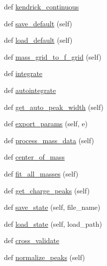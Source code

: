 \begin{DoxyCompactItemize}
\item 
def \hyperlink{class_uni_dec_1_1unidec_1_1_uni_dec_ac344ecb79f8a01cb8ecdd7459771c6be}{kendrick\+\_\+continuous}
\item 
def \hyperlink{class_uni_dec_1_1unidec_1_1_uni_dec_a78259a4b2c592f32a8b039e277f67e3c}{save\+\_\+default} (self)
\item 
def \hyperlink{class_uni_dec_1_1unidec_1_1_uni_dec_a4f1fe4dbaf59cdce231b50922ac94811}{load\+\_\+default} (self)
\item 
def \hyperlink{class_uni_dec_1_1unidec_1_1_uni_dec_ae3287b4ef1a2ede9f3c38fb027ffffea}{mass\+\_\+grid\+\_\+to\+\_\+f\+\_\+grid} (self)
\item 
def \hyperlink{class_uni_dec_1_1unidec_1_1_uni_dec_aa7e154f30f71d03e37969c012365b825}{integrate}
\item 
def \hyperlink{class_uni_dec_1_1unidec_1_1_uni_dec_afb6b4140d46c4a50f72089c4547acc33}{autointegrate}
\item 
def \hyperlink{class_uni_dec_1_1unidec_1_1_uni_dec_a5c15c7af6300484007805b71b9ef6e6a}{get\+\_\+auto\+\_\+peak\+\_\+width} (self)
\item 
def \hyperlink{class_uni_dec_1_1unidec_1_1_uni_dec_abc3b760ae3be4bad42acd17b24bf07fe}{export\+\_\+params} (self, e)
\item 
def \hyperlink{class_uni_dec_1_1unidec_1_1_uni_dec_a1c769a0b89a9fd023c92c560b72ff68c}{process\+\_\+mass\+\_\+data} (self)
\item 
def \hyperlink{class_uni_dec_1_1unidec_1_1_uni_dec_a95dcf60d7a9fcd406fccaddab86fb5d3}{center\+\_\+of\+\_\+mass}
\item 
def \hyperlink{class_uni_dec_1_1unidec_1_1_uni_dec_ad737c43319a27076ece8e994597ded79}{fit\+\_\+all\+\_\+masses} (self)
\item 
def \hyperlink{class_uni_dec_1_1unidec_1_1_uni_dec_a01ea6512d8b5ea226db571ea6d974b60}{get\+\_\+charge\+\_\+peaks} (self)
\item 
def \hyperlink{class_uni_dec_1_1unidec_1_1_uni_dec_aadab1a0cbb4870da3c060ff5ee334fa5}{save\+\_\+state} (self, file\+\_\+name)
\item 
def \hyperlink{class_uni_dec_1_1unidec_1_1_uni_dec_acdab5edac8a83708f248d1edf90200aa}{load\+\_\+state} (self, load\+\_\+path)
\item 
def \hyperlink{class_uni_dec_1_1unidec_1_1_uni_dec_a9e10616b1a53612c1d4456df122ebf32}{cross\+\_\+validate}
\item 
def \hyperlink{class_uni_dec_1_1unidec_1_1_uni_dec_ab51e5ec7b1f6c9b0fae1773359c3e74f}{normalize\+\_\+peaks} (self)

\end{DoxyCompactItemize}
